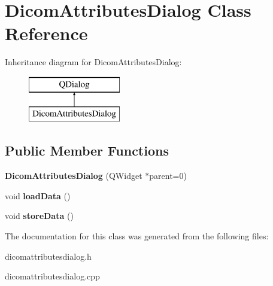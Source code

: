 \hypertarget{class_dicom_attributes_dialog}{}\section{Dicom\+Attributes\+Dialog Class Reference}
\label{class_dicom_attributes_dialog}
Inheritance diagram for Dicom\+Attributes\+Dialog\+:\begin{figure}[H]
\begin{center}
\leavevmode
\includegraphics[height=2.000000cm]{class_dicom_attributes_dialog}
\end{center}
\end{figure}
\subsection*{Public Member Functions}
\begin{DoxyCompactItemize}
\item 
\mbox{\label{class_dicom_attributes_dialog_a9d229081ef7e02c39d70b9550ca67871}} 
{\bfseries Dicom\+Attributes\+Dialog} (Q\+Widget $\ast$parent=0)
\item 
\mbox{\label{class_dicom_attributes_dialog_a2dec90cf3801a1f56cb1e9f3b4af0d6d}} 
void {\bfseries load\+Data} ()
\item 
\mbox{\label{class_dicom_attributes_dialog_ad5754486b8b8fea295e8a616363fb24e}} 
void {\bfseries store\+Data} ()
\end{DoxyCompactItemize}


The documentation for this class was generated from the following files\+:\begin{DoxyCompactItemize}
\item 
dicomattributesdialog.\+h\item 
dicomattributesdialog.\+cpp\end{DoxyCompactItemize}
